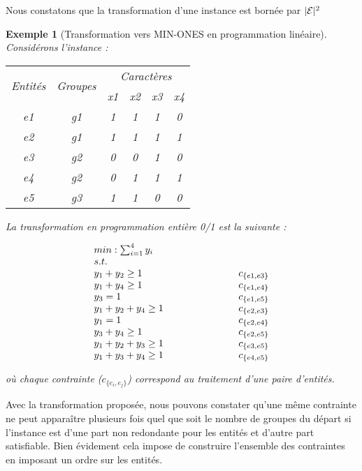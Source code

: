 \documentclass[a4paper,10pt]{article}
\newtheorem{exemple}{Exemple}
\begin{document}
Nous constatons que la transformation d'une instance est bornée par $|{\cal E}|^2$
\begin{exemple}[Transformation vers MIN-ONES en programmation linéaire]
Considérons l'instance :

\begin{center}
\begin{tabular}{|c|c||c|c|c|c|}
\hline
\multirow{2}{*}{Entités}&\multirow{2}{*}{Groupes}&\multicolumn{4}{c|}{Caractères}
\\
&&x1&x2&x3&x4\\
\hline
\hline
e1&g1&1&1&1&0\\
\hline
e2&g1&1&1&1&1\\
\hline
e3&g2&0&0&1&0\\
\hline
e4&g2&0&1&1&1\\
\hline
e5&g3&1&1&0&0\\
\hline
\end{tabular}

\par La transformation en programmation entière 0/1 est la suivante :

\[\begin{array}{l m{2cm} r}
\multicolumn{3}{l}{min : \sum_{i=1}^{4} y_i}\\
\multicolumn{3}{l}{s.t.} \\
  y_1+y_2\geq 1 &&  c_{\{e1,e3\}}\\
  y_1+y_4\geq 1&&  c_{\{e1,e4\}}\\
  y_3 = 1&& c_{\{e1,e5\}}\\
  y_1+y_2+y_4 \geq 1&&  c_{\{e2,e3\}}\\
  y_1 = 1&& c_{\{e2,e4\}}\\
  y_3 + y_4 \geq 1&&  c_{\{e2,e5\}}\\
  y_1+y_2+y_3\geq 1&& c_{\{e3,e5\}}\\
  y_1+y_3 + y_4 \geq 1&&  c_{\{e4,e5\}}
\end{array}\]

\end{center}
où chaque contrainte ($c_{\{e_i,e_j\}}$) correspond au traitement d'une paire
d'entités.
\end{exemple}

Avec la transformation proposée, nous pouvons constater qu'une même contrainte
ne peut apparaître plusieurs fois quel que soit le nombre de groupes du départ si
l'instance est d'une part non redondante pour les entités et d'autre part
satisfiable. Bien évidement cela impose de construire l'ensemble des contraintes
en imposant un ordre sur les entités.
\end{document}
